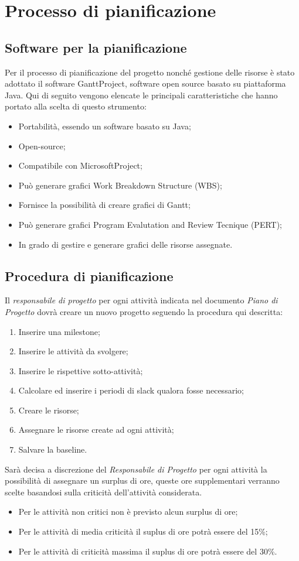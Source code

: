 \section{Processo di pianificazione}
\subsection{Software per la pianificazione}
Per il processo di pianificazione del progetto nonché gestione delle risorse è stato adottato il software GanttProject, software open source basato su piattaforma Java. Qui di seguito vengono elencate le principali caratteristiche che hanno portato alla scelta di questo strumento:
\begin{itemize}
\item Portabilità, essendo un software basato su Java;
\item Open-source;
\item Compatibile con MicrosoftProject;
\item Può generare grafici Work Breakdown Structure (WBS);
\item Fornisce la possibilità di creare grafici di Gantt;
\item Può generare grafici Program Evalutation and Review Tecnique (PERT);
\item In grado di gestire e generare grafici delle risorse assegnate.
\end{itemize}

\subsection{Procedura di pianificazione}
Il \textit{responsabile di progetto} per ogni attività indicata nel documento \textit{Piano di Progetto} dovrà creare un nuovo progetto seguendo la procedura qui descritta:

\begin{enumerate}
\item Inserire una milestone;
\item Inserire le attività da svolgere;
\item Inserire le rispettive sotto-attività;
\item Calcolare ed inserire i periodi di slack qualora fosse necessario;
\item Creare le risorse;
\item Assegnare le risorse create ad ogni attività;
\item Salvare la baseline.
\end{enumerate}

Sarà decisa a discrezione del \textit{Responsabile di Progetto} per ogni attività la possibilità di assegnare un surplus di ore, queste ore supplementari verranno scelte basandosi sulla criticità dell'attività considerata.

\begin{itemize}
\item Per le attività non critici non è previsto alcun surplus di ore;
\item Per le attività di media criticità il suplus di ore potrà essere del 15\%;
\item Per le attività di criticità massima il suplus di ore potrà essere del 30\%.
\end{itemize}

